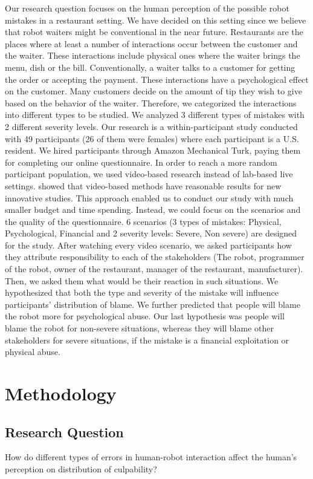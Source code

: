 \documentclass{sigchi}
\begin{document}
Our research question focuses on the human perception of the possible robot mistakes in a restaurant setting. We have decided on this setting since we believe that robot waiters might be conventional in the near future. Restaurants are the places where at least a number of interactions occur between the customer and the waiter. These interactions include physical ones where the waiter brings the menu, dish or the bill. Conventionally, a waiter talks to a customer for getting the order or accepting the payment. These interactions have a psychological effect on the customer. Many customers decide on the amount of tip they wish to give based on the behavior of the waiter. Therefore, we categorized the interactions into different types to be studied.  We analyzed 3 different types of mistakes with 2 different severity levels. Our research is a within-participant study conducted with 49 participants (26 of them were females) where each participant is a U.S. resident. We hired participants through Amazon Mechanical Turk, paying them for completing our online questionnaire. In order to reach a more random participant population, we used video-based research instead of lab-based live settings. \cite{woods2006comparing} showed that video-based methods have reasonable results for new innovative studies. This approach enabled us to conduct our study with much smaller budget and time spending. Instead, we could focus on the scenarios and the quality of the questionnaire. 6 scenarios (3 types of mistakes: Physical, Psychological, Financial and 2 severity levels: Severe, Non severe) are designed for the study. After watching every video scenario, we asked participants how they attribute responsibility to each of the stakeholders (The robot, programmer of the robot, owner of the restaurant, manager of the restaurant, manufacturer). Then, we asked them what would be their reaction in such situations. We hypothesized that both the type and severity of the mistake will influence participants' distribution of blame. We further predicted that people will blame the robot more for psychological abuse. Our last hypothesis was people will blame the robot for non-severe situations, whereas they will blame other stakeholders for severe situations, if the mistake is a financial exploitation or physical abuse.

\section{Methodology}
\subsection{Research Question}
How do different types of errors in human-robot interaction affect the human’s perception on distribution of culpability?
\end{document}
